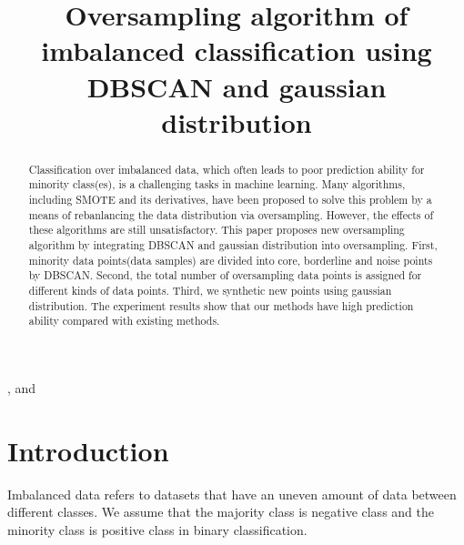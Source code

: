 \documentclass[ida]{iosart2x}
\begin{document}
\begin{frontmatter} %

%
\title{Oversampling algorithm of imbalanced classification using DBSCAN and gaussian distribution}


\author[A]{ },
and
\author[B]{ }

\address[A]{Harbin Institute of Technology }
\address[B]{Harbin Institute of Technology }

\begin{abstract}
  Classification over imbalanced data, which often leads to poor prediction ability for 
  minority class(es), is a challenging tasks in machine learning.
  Many algorithms, including SMOTE and its derivatives, 
  have been proposed to
  solve this problem by a means of rebanlancing the data distribution via oversampling. However, 
  the effects of these algorithms are still unsatisfactory. This paper proposes
  new oversampling algorithm by integrating DBSCAN and gaussian distribution into oversampling.  
  First, minority data points(data samples) are
  divided into core, borderline and noise points by DBSCAN. 
  Second, the total number of oversampling data points is
  assigned for different kinds of data points. Third, 
  we synthetic new points using gaussian distribution.
  The experiment results
  show that our methods have high prediction ability compared with existing methods.
\end{abstract}

\begin{keyword}
\end{keyword}
\end{frontmatter}




\section{Introduction}
Imbalanced data \cite{2004Editorial} refers to datasets that have an uneven 
amount of data between different classes. 
We assume that the majority class is negative class and 
the minority class is positive class in binary classification.
\end{document}
